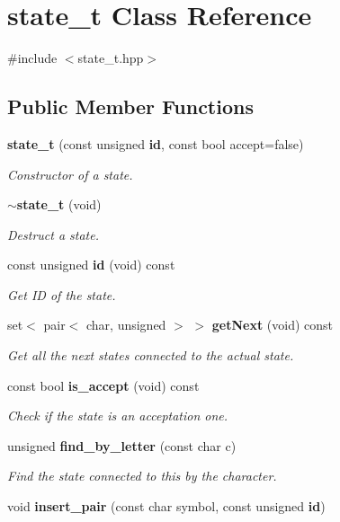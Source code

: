 \section{state\+\_\+t Class Reference}
\label{classstate__t}


{\ttfamily \#include $<$state\+\_\+t.\+hpp$>$}

\subsection*{Public Member Functions}
\begin{DoxyCompactItemize}
\item 
\textbf{ state\+\_\+t} (const unsigned \textbf{ id}, const bool accept=false)
\begin{DoxyCompactList}\small\item\em Constructor of a state. \end{DoxyCompactList}\item 
\textbf{ $\sim$state\+\_\+t} (void)
\begin{DoxyCompactList}\small\item\em Destruct a state. \end{DoxyCompactList}\item 
const unsigned \textbf{ id} (void) const
\begin{DoxyCompactList}\small\item\em Get ID of the state. \end{DoxyCompactList}\item 
set$<$ pair$<$ char, unsigned $>$ $>$ \textbf{ get\+Next} (void) const
\begin{DoxyCompactList}\small\item\em Get all the next states connected to the actual state. \end{DoxyCompactList}\item 
const bool \textbf{ is\+\_\+accept} (void) const
\begin{DoxyCompactList}\small\item\em Check if the state is an acceptation one. \end{DoxyCompactList}\item 
unsigned \textbf{ find\+\_\+by\+\_\+letter} (const char c)
\begin{DoxyCompactList}\small\item\em Find the state connected to this by the character. \end{DoxyCompactList}\item 
void \textbf{ insert\+\_\+pair} (const char symbol, const unsigned \textbf{ id})

\end{DoxyCompactItemize}
